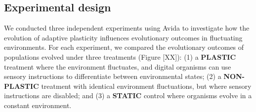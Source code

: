 
\vspace{0.7cm}
\subsection{Experimental design}
\label{sec:methods:experiment}


We conducted three independent experiments using Avida to investigate how the evolution of adaptive plasticity influences evolutionary outcomes in fluctuating environments.
For each experiment, we compared the evolutionary outcomes of populations evolved under three treatments (Figure [XX]): 
(1) a \textbf{PLASTIC} treatment where the environment fluctuates, and digital organisms can use sensory instructions to differentiate between environmental states;
(2) a \textbf{NON-PLASTIC} treatment with identical environment fluctuations, but where sensory instructions are disabled;
and (3) a \textbf{STATIC} control where organisms evolve in a constant environment.


